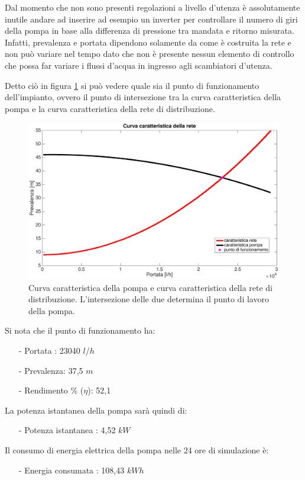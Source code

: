 \documentclass[laurea,oneside,11pt]{USiena_tesiLM}
\begin{document}
Dal momento che non sono presenti regolazioni a livello d'utenza è assolutamente inutile andare ad inserire ad esempio un inverter per controllare il numero di giri della pompa in base alla differenza di pressione tra mandata e ritorno misurata. Infatti, prevalenza e portata dipendono solamente da come è costruita la rete e non può variare nel tempo dato che non è presente nessun elemento di controllo che possa far variare i flussi d'acqua in ingresso agli scambiatori d'utenza.

Detto ciò in figura \ref{fig:sim1_noreg} si può vedere quale sia il punto di funzionamento dell'impianto, ovvero il punto di intersezione tra la curva caratteristica della pompa e la curva caratteristica della rete di distribuzione.

\begin{figure}[!ht]
\centering
\includegraphics[width=\textwidth]{figure/sim1_noreg} 
\caption{Curva caratteristica della pompa e curva caratteristica della rete di distribuzione. L'intersezione delle due determina il punto di lavoro della pompa. }
\label{fig:sim1_noreg}
\end{figure}

Si nota che il punto di funzionamento ha:
\begin{itemize}
\item[-] Portata : 23040 $l/h$
\item[-] Prevalenza: 37,5 $m$
\item[-] Rendimento \% ($\eta$): 52,1%
\end{itemize}

La potenza istantanea della pompa sarà quindi di:
\begin{itemize}
\item[-] Potenza istantanea : 4,52 $kW$
\end{itemize}
Il consumo di energia elettrica della pompa nelle 24 ore di simulazione è:
\begin{itemize}
\item[-] Energia consumata : 108,43 $kWh$
\end{itemize}
\end{document}
